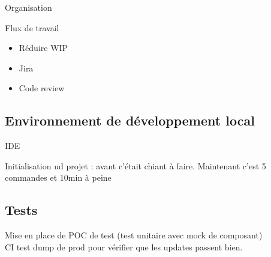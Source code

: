 \begin{frame}{Organisation}
	\begin{block}{Flux de travail}
		\begin{itemize}
			\item Réduire WIP
			\item Jira
			\item Code review
		\end{itemize}
	\end{block}

\end{frame}

\subsection[Développement]{Environnement de développement local}
\begin{frame}{\subsecname}
	IDE
	
	Initialisation ud projet : avant c'était chiant à faire. Maintenant c'est 5 commandes et 10min à peine
\end{frame}

\subsection{Tests}
\begin{frame}{\subsecname}
	Mise en place de POC de test (test unitaire avec mock de composant) \\
	CI test dump de prod pour vérifier que les updates passent bien.
\end{frame}

